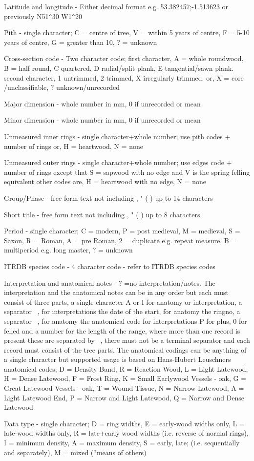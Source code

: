 \documentclass[10pt, headsepline,DIV14,BCOR0.5cm]{scrreprt}
\begin{document}
\begin{enumerate*}
 \item Latitude and longitude - Either decimal format e.g. 53.382457;-1.513623 or previously N51\verb|^|30 W1\verb|^|20
 \item Pith - single character; C = centre of tree, V = within 5 years of centre, F = 5-10 years of centre, G = greater than 10, ? = unknown
 \item Cross-section code - Two character code; first character, A = whole roundwood, B = half round, C quartered, D radial/split plank, E tangential/sawn plank. second character, 1 untrimmed, 2 trimmed, X irregularly trimmed. or, X = core /unclassifiable, ? unknown/unrecorded 
 \item Major dimension - whole number in mm, 0 if unrecorded or mean
 \item Minor dimension - whole number in mm, 0 if unrecorded or mean
 \item Unmeasured inner rings - single character+whole number; use pith codes + number of rings or, H = heartwood, N = none 
 \item Unmeasured outer rings - single character+whole number; use edges code + number of rings except that S = sapwood with no edge and V is the spring felling equivalent other codes are, H = heartwood with no edge, N = none
 \item Group/Phase - free form text not including , " ( ) up to 14 characters 
 \item Short title - free form text not including , " ( ) up to 8 characters 
 \item Period - single character; C = modern, P = post medieval, M = medieval, S = Saxon, R = Roman, A = pre Roman, 2 = duplicate e.g. repeat measure, B = multiperiod e.g. long master, ? = unknown 
 \item ITRDB species code - 4 character code - refer to ITRDB species codes 
 \item Interpretation and anatomical notes - ? =no interpretation/notes. The interpretation and the anatomical notes can be in any order but each must consist of three parts, a single character A or I for anatomy or interpretation, a separator ~, for interpretations the date of the start, for anatomy the ringno, a separator ~, for anatomy the anatomical code for interpretations P for plus, 0 for felled and a number for the length of the range, where more than one record is present these are separated by ~, there must not be a terminal separator and each record must consist of the tree parts. The anatomical codings can be anything of a single character but supported usage is based on Hans-Hubert Leuschners anatomical codes; D = Density Band, R = Reaction Wood, L = Light Latewood, H = Dense Latewood, F = Frost Ring, K = Small Earlywood Vessels - oak, G = Great Latewood Vessels - oak, T = Wound Tissue, N = Narrow Latewood, A = Light Latewood End, P = Narrow and Light Latewood, Q = Narrow and Dense Latewood 
 \item Data type - single character; D = ring widths, E = early-wood widths only, L = late-wood widths only, R = late+early wood widths (i.e. reverse of normal rings), I = minimum density, A = maximum density, S = early, late; (i.e. sequentially and separately), M = mixed (?means of others)


\end{enumerate*}
\end{document}
